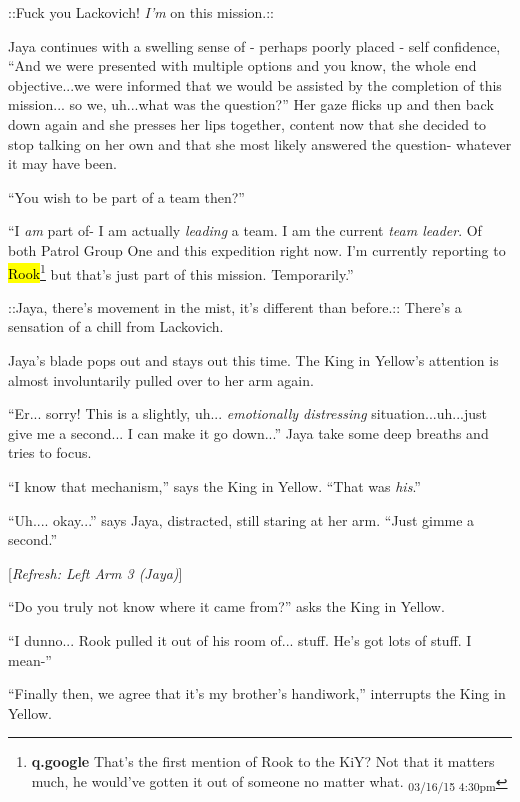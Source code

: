  {\color[RGB]{255,0,0}::Fuck you Lackovich!  } \textit{ {\color[RGB]{255,0,0}I'm} } {\color[RGB]{255,0,0} on this mission.:: } 

Jaya continues with a swelling sense of - perhaps poorly placed - self confidence, ``And we were presented with multiple options and you know, the whole end objective...we were informed that we would be assisted by the completion of this mission... so we, uh...what was the question?'' Her gaze flicks up and then back down again and she presses her lips together, content now that she decided to stop talking on her own and that she most likely answered the question- whatever it may have been.

``You wish to be part of a team then?''

``I \textit{am} part of- I am actually \textit{leading} a team.  I am the current \textit{team leader}.  Of both Patrol Group One and this expedition right now.  I'm currently reporting to \hl{Rook}\footnote{\textbf{q.google }That's the first mention of Rook to the KiY?  Not that it matters much, he would've gotten it out of someone no matter what. \textsubscript{03/16/15 4:30pm}} but that's just part of this mission. Temporarily.''

 {\color[RGB]{74,134,232}::Jaya, there's movement in the mist, it's different than before.::}  There's a sensation of a chill from Lackovich. 

Jaya's blade pops out and stays out this time.  The King in Yellow's attention is almost involuntarily pulled over to her arm again.

``Er... sorry!  This is a slightly, uh... \textit{emotionally distressing} situation...uh...just give me a second... I can make it go down...'' Jaya take some deep breaths and tries to focus.

``I know that mechanism,'' says the King in Yellow.  ``That was \textit{his}.''

``Uh.... okay...'' says Jaya, distracted, still staring at her arm.  ``Just gimme a second.''

{[}\textit{Refresh: Left Arm 3 (Jaya)}{]}

``Do you truly not know where it came from?'' asks the King in Yellow.

``I dunno... Rook pulled it out of his room of... stuff.  He's got lots of stuff.  I mean-''

``Finally then, we agree that it's my brother's handiwork,'' interrupts the King in Yellow.



